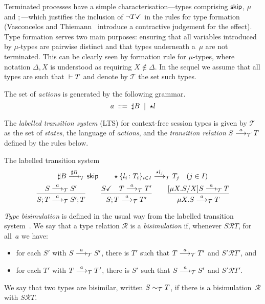 Terminated processes have a simple characterisation---types comprising
$\skipk$, $\mu$ and $;$---which justifies the inclusion of
$\neg\DONE T$ in the rules for type formation (Vasconcelos and
Thiemann~\cite{thiemann2016context} introduce a contractive judgement
for the effect).
%
Type formation serves two main purposes: ensuring that all variables
introduced by $\mu$-types are pairwise distinct and that types
underneath a~$\mu$ are not terminated. This can be clearly seen by
formation rule for $\mu$-types, where notation $\Delta,X$ is
understood as requiring $X\notin\Delta$.
%
In the sequel we assume that all types are such that $\isType[] T$ and
denote by $\mathcal{T}$ the set such types.

The set of \emph{actions} is generated by the following grammar.
\begin{equation*}
  a \grmeq \sharp B \grmor \star l
\end{equation*}

The \emph{labelled transition system} (LTS) for context-free session
types is given by $\mathcal{T}$ as the set of \emph{states}, the
language of \emph{actions}, and the \emph{transition relation}
$S\LTSderives T$ defined by the rules below.

\noindent The labelled transition system\hfill{}
%
\begin{gather*}
  \sharp B \LTSderives[\sharp B] \skipk
  \qquad
  \star\{l_i\colon T_i\}_{i\in I} \LTSderives[\star l_j] T_j\quad
  (j\in I)
  \\
  \frac{S \LTSderives S'}{S; T \LTSderives S';T}
  \qquad
  \frac{\DONE{S} \quad T \LTSderives T'}{S; T \LTSderives T'}
  \qquad
  \frac{\subs{\mu X.S}{X}S \LTSderives T}{\mu X.S \LTSderives T}
\end{gather*}

\emph{Type bisimulation} is defined in the usual way from the labelled
transition system~\cite{sangiorgi2014introduction}.
%
We say that a type relation $\mathcal R$ is a \emph{bisimulation} if,
whenever $S\mathcal RT$, for all~$a$ we have:
%
\begin{itemize}
\item for each $S'$ with $S \LTSderives S'$, there is $T'$ such that $T
  \LTSderives T'$ and $S'\mathcal RT'$, and
\item for each $T'$ with $T \LTSderives T'$, there is $S'$ such that $S
  \LTSderives S'$ and $S'\mathcal RT'$.
\end{itemize}
%
We say that two types are bisimilar, written $S \bisim T$, if there
is a bisimulation~$\mathcal R$ with $S\mathcal RT$.

